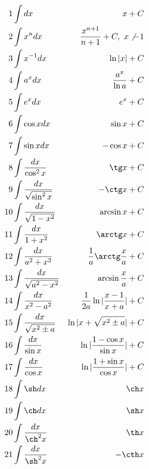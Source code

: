 \documentclass{article}
\begin{document}
\begin{align*}
  1 &\int dx & x + C\\
  2 &\int x^{n}dx &\frac{x^{n+1}}{n+1} + C, ~ x \not -1\\
  3 &\int x^{-1}dx &\ln |x| + C\\
  4 &\int a^{x}dx &\frac{a^x}{\ln a} + C\\
  5 &\int e^{x}dx &e^x + C\\
  6 &\int \cos x dx &\sin x + C\\
  7 &\int \sin x dx &-\cos x + C\\
  8 &\int \frac{dx}{\cos^2 x} &\tg x + C\\
  9 &\int \frac{dx}{\sqrt{\sin^2 x}} &-\ctg x + C\\
  10&\int \frac{dx}{\sqrt{1-x^2}} &\arcsin x + C\\
  11&\int \frac{dx}{1+x^2} &\arctg x + C\\
  12&\int \frac{dx}{a^2+x^2} &\frac{1}{a}\arctg \frac{x}{a} + C\\
  13&\int \frac{dx}{\sqrt{a^2-x^2}}& \arcsin \frac{x}{a} + C\\
  14&\int \frac{dx}{x^2-a^2} &\frac{1}{2a}\ln |\frac{x-1}{x+a}| + C\\
  15&\int \frac{dx}{\sqrt{x^2 \pm a}} &\ln |x + \sqrt{x^2 \pm a}| + C\\
  16&\int \frac{dx}{\sin x} &\ln |\frac{1-\cos x}{\sin x}| + C\\
  17&\int \frac{dx}{\cos x} &\ln |\frac{1+\sin x}{\cos x}| + C\\
  18&\int \sh dx &\ch x\\
  19&\int \ch dx &\sh x\\
  20&\int \frac{dx}{\ch^2 x} & {\th} x\\
  21&\int \frac{dx}{\sh^2 x} & -\cth x\\
\end{align*}


\end{document}
